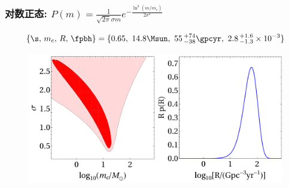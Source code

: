 \documentclass[xcolor={svgnames},compress]{beamer}
\begin{document}
\begin{frame}
    \frametitle{对数正态: \large $P(m) = \frac{1}{\sqrt{2 \pi} \sigma m} 
        e^{-\frac{\ln^2(m/m_c)}{2 \sigma^2}}$ }
    \begin{block}{}\vspace{-3mm}\small{
            \[
            \{\s,\, m_c,\, R,\, \fpbh\} = \{0.65,\ 14.8 \Msun,\ 
            55\,^{+74}_{-38} \gpcyr,\ 2.8\,^{+1.6}_{-1.3} \times 10^{-3}\}
            \]
        }
        \vspace{-4mm}
    \end{block}  
    \begin{figure}[htbp!]
        \centering
        \includegraphics[width = \textwidth]{./pic/posterior-PBH-log.pdf}
    \end{figure}
\end{frame}
\end{document}
